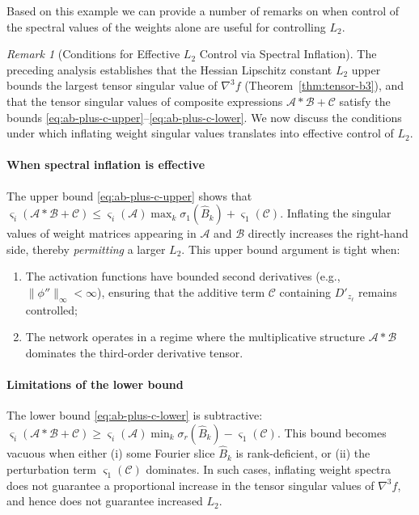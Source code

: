 \documentclass{article}
\theoremstyle{plain}
\theoremstyle{definition}
\theoremstyle{remark}
\newtheorem{remark}[theorem]{Remark}
\begin{document}
Based on this example we can provide a number of remarks on when control of the spectral values of the weights alone are useful for controlling $L_2$.

\begin{remark}[Conditions for Effective $L_2$ Control via Spectral Inflation]
\label{rem:L2-control-conditions}
The preceding analysis establishes that the Hessian Lipschitz constant $L_2$ 
upper bounds the largest tensor singular value of $\nabla^3 f$ 
(Theorem~\ref{thm:tensor-b3}), and that the tensor singular values of 
composite expressions $\mathcal{A} * \mathcal{B} + \mathcal{C}$ satisfy 
the bounds \eqref{eq:ab-plus-c-upper}--\eqref{eq:ab-plus-c-lower}. 
We now discuss the conditions under which inflating weight singular values 
translates into effective control of $L_2$.

\paragraph{When spectral inflation is effective}
The upper bound \eqref{eq:ab-plus-c-upper} shows that 
$\varsigma_i(\mathcal{A} * \mathcal{B} + \mathcal{C}) \le 
\varsigma_i(\mathcal{A})\max_k \sigma_1(\widehat{B}_k) + \varsigma_1(\mathcal{C})$.
Inflating the singular values of weight matrices appearing in $\mathcal{A}$ 
and $\mathcal{B}$ directly increases the right-hand side, thereby 
\emph{permitting} a larger $L_2$. This upper bound argument is tight when:
\begin{enumerate}[label=(\roman*),leftmargin=2em]
    \item The activation functions have bounded second derivatives 
    (e.g., $\|\phi''\|_\infty < \infty$), ensuring that the additive term 
    $\mathcal{C}$ containing $D'_{z_\ell}$ remains controlled;
    \item The network operates in a regime where the multiplicative 
    structure $\mathcal{A} * \mathcal{B}$ dominates the third-order 
    derivative tensor.
\end{enumerate}

\paragraph{Limitations of the lower bound}
The lower bound \eqref{eq:ab-plus-c-lower} is subtractive: 
$\varsigma_i(\mathcal{A} * \mathcal{B} + \mathcal{C}) \ge 
\varsigma_i(\mathcal{A})\min_k \sigma_r(\widehat{B}_k) - \varsigma_1(\mathcal{C})$.
This bound becomes vacuous when either (i) some Fourier slice $\widehat{B}_k$ 
is rank-deficient, or (ii) the perturbation term $\varsigma_1(\mathcal{C})$ 
dominates. In such cases, inflating weight spectra does not guarantee a 
proportional increase in the tensor singular values of $\nabla^3 f$, 
and hence does not guarantee increased $L_2$.


\end{remark}
\end{document}
